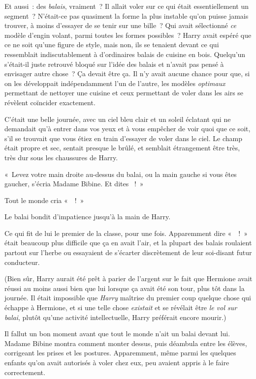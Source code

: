 Et aussi~: des \emph{balais}, vraiment~? Il allait voler sur ce qui était essentiellement un segment~? N'était-ce pas quasiment la forme la plus instable qu'on puisse jamais trouver, à moins d'essayer de se tenir sur une bille~? Qui avait sélectionné \emph{ce} modèle d'engin volant, parmi toutes les formes possibles~? Harry avait espéré que ce ne soit qu'une figure de style, mais non, ils se tenaient devant ce qui ressemblait indiscutablement à d'ordinaires balais de cuisine en bois. Quelqu'un s'était-il juste retrouvé bloqué sur l'idée des balais et n'avait pas pensé à envisager autre chose~? Ça devait être ça. Il n'y avait aucune chance pour que, si on les développait indépendamment l'un de l'autre, les modèles \emph{optimaux} permettant de nettoyer une cuisine et ceux permettant de voler dans les airs se révèlent coïncider exactement.

C'était une belle journée, avec un ciel bleu clair et un soleil éclatant qui ne demandait qu'à entrer dans vos yeux et à vous empêcher de voir quoi que ce soit, s'il se trouvait que vous étiez en train d'essayer de voler dans le ciel. Le champ était propre et sec, sentait presque le brûlé, et semblait étrangement être très, très dur sous les chaussures de Harry.

«~Levez votre main droite au-dessus du balai, ou la main gauche si vous êtes gaucher, s'écria Madame Bibine. Et dites ~!~»

Tout le monde cria «~~!~»

Le balai bondit d'impatience jusqu'à la main de Harry.

Ce qui fit de lui le premier de la classe, pour une fois. Apparemment dire «~~!~» était beaucoup plus difficile que ça en avait l'air, et la plupart des balais roulaient partout sur l'herbe ou essayaient de s'écarter discrètement de leur soi-disant futur conducteur.

(Bien sûr, Harry aurait été prêt à parier de l'argent sur le fait que Hermione avait réussi au moins aussi bien que lui lorsque ça avait été son tour, plus tôt dans la journée. Il était impossible que \emph{Harry} maîtrise du premier coup quelque chose qui échappe à Hermione, et si une telle chose \emph{existait} et se révélait être \emph{le vol sur balai}, plutôt qu'une activité intellectuelle, Harry préférait encore mourir.)

Il fallut un bon moment avant que tout le monde n'ait un balai devant lui. Madame Bibine montra comment monter dessus, puis déambula entre les élèves, corrigeant les prises et les postures. Apparemment, même parmi les quelques enfants qu'on avait autorisés à voler chez eux, peu avaient appris à le faire correctement.

